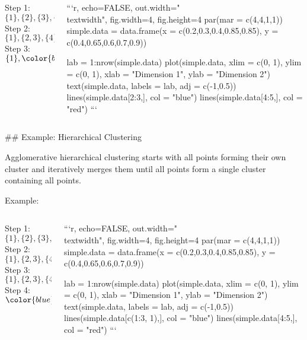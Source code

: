 \begin{columns}

\begin{column}{0.5\textwidth}
Step 1: $\{1\},\{2\},\{3\},\{4\},\{5\}$\\
Step 2: $\{1\},\{2,3\},\{4\},\{5\}$ \\
Step 3: $\{1\},{\color{blue}\{2,3\}},{\color{red}\{4,5\}}$\\
\end{column}
\begin{column}{0.4\textwidth}

```{r, echo=FALSE, out.width="\\textwidth", fig.width=4, fig.height=4}
par(mar = c(4,4,1,1))
simple.data = data.frame(x = c(0.2,0.3,0.4,0.85,0.85),
  y = c(0.4,0.65,0.6,0.7,0.9))

lab = 1:nrow(simple.data)
plot(simple.data, xlim = c(0, 1), ylim = c(0, 1), xlab = "Dimension 1", ylab = "Dimension 2")
text(simple.data, labels = lab, adj = c(-1,0.5))
lines(simple.data[2:3,], col = "blue")
lines(simple.data[4:5,], col = "red")
```

\end{column}
\end{columns}


## Example: Hierarchical Clustering

\addtocounter{framenumber}{-1}

Agglomerative hierarchical clustering starts with all points forming their own cluster and iteratively merges them until all points form a single cluster containing all points.

Example:

\begin{columns}

\begin{column}{0.5\textwidth}
Step 1: $\{1\},\{2\},\{3\},\{4\},\{5\}$\\
Step 2: $\{1\},\{2,3\},\{4\},\{5\}$ \\
Step 3: $\{1\},\{2,3\},\{4,5\}$\\
Step 4: ${\color{blue}\{1,2,3\}},{\color{red}\{4,5\}}$\\
\end{column}
\begin{column}{0.4\textwidth}

```{r, echo=FALSE, out.width="\\textwidth", fig.width=4, fig.height=4}
par(mar = c(4,4,1,1))
simple.data = data.frame(x = c(0.2,0.3,0.4,0.85,0.85),
  y = c(0.4,0.65,0.6,0.7,0.9))

lab = 1:nrow(simple.data)
plot(simple.data, xlim = c(0, 1), ylim = c(0, 1), xlab = "Dimension 1", ylab = "Dimension 2")
text(simple.data, labels = lab, adj = c(-1,0.5))
lines(simple.data[c(1:3, 1),], col = "blue")
lines(simple.data[4:5,], col = "red")
```

\end{column}
\end{columns}


